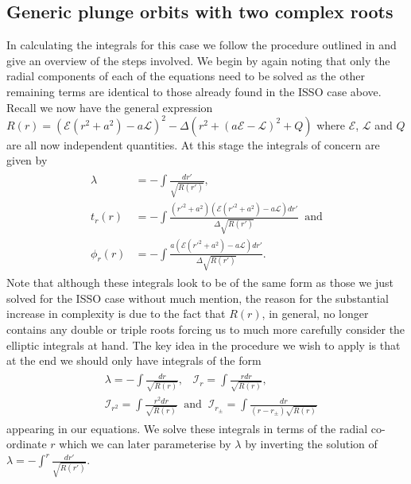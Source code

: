 \documentclass[12pt, amsmath]{revtex4-2}
\newcommand\lam{\lambda}
\newcommand\EN{\mathcal{E}}
\newcommand\ANG{\mathcal{L}}
\begin{document}
\subsection{Generic plunge orbits with two complex roots}
In calculating the integrals for this case we follow the procedure outlined in \cite{LabanMutrie} and give an overview of the steps involved. We begin by again noting  that only the radial components of each of the equations need to be solved as the other remaining terms are identical to those already found in the ISSO case above. Recall we now have the general expression $R(r) = (\mathcal{E}(r^2+a^2)-a\mathcal{L})^2-\Delta(r^2+(a\mathcal{E}-\mathcal{L})^2+Q)$ where $\EN$, $\ANG$ and $Q$ are all now independent quantities. At this stage the integrals of concern are given by 
\begin{align}\label{Kerr EOM}
    \begin{aligned}
        \lambda &= -\int\frac{dr'}{\sqrt{ R(r')}},\\
        t_r(r) &= -\int \frac{(r'^2+a^2)(\EN(r'^2+a^2)-a\mathcal{L}) dr'}{\Delta\sqrt{ R(r')}}\;\; \text{and} \\
        \phi_r(r) &= -\int \frac{a(\mathcal{E}(r'^2+a^2)-a\mathcal{L})dr'}{\Delta\sqrt{ R(r')}}. 
    \end{aligned}
\end{align}
Note that although these integrals look to be of the same form as those we just solved for the ISSO case without much mention, the reason for the substantial increase in complexity is due to the fact that $R(r)$, in general, no longer contains any double or triple roots forcing us to much more carefully consider the elliptic integrals at hand. The key idea in the procedure we wish to apply is that at the end we should only have integrals of the form
\begin{align}\label{eq:ellipticBasis}
    \begin{aligned}
     &\lam = -\int\frac{dr}{\sqrt{ R(r)}},\;\;\; \mathcal{I}_r = \int\frac{rdr}{\sqrt{ R(r)}},\\
     &\mathcal{I}_{r^2} = \int\frac{r^2dr}{\sqrt{ R(r)}}\;\; \text{and} \;\;\mathcal{I}_{r_{\pm}} = \int\frac{dr}{(r-r_{\pm})\sqrt{ R(r)}}
    \end{aligned}
\end{align}
appearing in our equations. We solve these integrals in terms of the radial co-ordinate $r$ which we can later parameterise by $\lam$ by inverting the solution of $\lam = -\int^{r}\frac{dr'}{\sqrt{ R(r')}}$.
\end{document}
